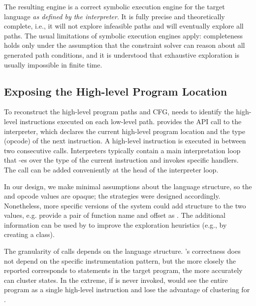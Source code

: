 The resulting engine is a correct symbolic execution engine for the target language \textit{as defined by the interpreter}. It is fully precise and theoretically complete, i.e., it will not explore infeasible paths and will eventually explore all paths. The usual limitations of symbolic execution engines apply: completeness holds only under the assumption that the constraint solver can reason about all generated path conditions, and it is understood that exhaustive exploration is usually impossible in finite time.


\subsection{Exposing the High-level Program Location}
\label{sec:chef:exposehlpc}

To reconstruct the high-level program paths and CFG, \chef needs to identify the high-level instructions executed on each low-level path.  \chef provides the  API call to the interpreter, which declares the current high-level program location and the type (opcode) of the next instruction.  A high-level instruction is executed in between two consecutive  calls.
%
Interpreters typically contain a main interpretation loop that -es over the type of the current instruction and invokes specific handlers.  The  call can be added conveniently at the head of the interpreter loop.

In our design, we make minimal assumptions about the language structure, so the \hlpc and opcode values are opaque; the \cupa strategies were designed accordingly.  Nonetheless, more specific versions of the system could add structure to the two values, e.g. provide a pair of function name and offset as \hlpc.  The additional information can be used by \chef to improve the exploration heuristics (e.g., by creating a \cupa class).

The granularity of  calls depends on the language structure.  \chef's correctness does not depend on the specific instrumentation pattern, but the more closely the reported \hlpc corresponds to statements in the target program, the more accurately \cupa can cluster states. In the extreme, if  is never invoked, \chef would see the entire program as a single high-level instruction and lose the advantage of \cupa clustering for \hlpcs.

\fi

